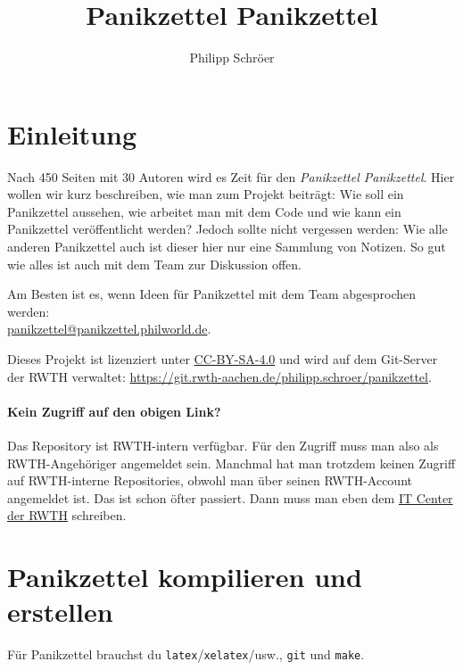 \documentclass{panikzettel}
\title{Panikzettel Panikzettel}
\author{Philipp Schröer}
\begin{document}
\maketitle

\tableofcontents

\section{Einleitung}

Nach 450 Seiten mit 30 Autoren wird es Zeit für den \emph{Panikzettel Panikzettel}.
Hier wollen wir kurz beschreiben, wie man zum Projekt beiträgt: Wie soll ein Panikzettel aussehen, wie arbeitet man mit dem Code und wie kann ein Panikzettel veröffentlicht werden?
Jedoch sollte nicht vergessen werden: Wie alle anderen Panikzettel auch ist dieser hier nur eine Sammlung von Notizen.
So gut wie alles ist auch mit dem Team zur Diskussion offen.

Am Besten ist es, wenn Ideen für Panikzettel mit dem Team abgesprochen werden: \\
\href{mailto:panikzettel@panikzettel.philworld.de}{panikzettel@panikzettel.philworld.de}.

Dieses Projekt ist lizenziert unter \href{https://creativecommons.org/licenses/by-sa/4.0/}{CC-BY-SA-4.0} und wird auf dem Git-Server der RWTH verwaltet: \url{https://git.rwth-aachen.de/philipp.schroer/panikzettel}.

\vspace{-0.5\baselineskip}
{\small{}
\paragraph{Kein Zugriff auf den obigen Link?}
Das Repository ist RWTH-intern verfügbar.
Für den Zugriff muss man also als RWTH-Angehöriger angemeldet sein.
Manchmal hat man trotzdem keinen Zugriff auf RWTH-interne Repositories, obwohl man über seinen RWTH-Account angemeldet ist.
Das ist schon öfter passiert.
Dann muss man eben dem \href{http://www.itc.rwth-aachen.de/cms/IT-Center/Services/kompletter-Servicekatalog/Beschaffungsportale/~estp/ServiceDesk/?lidx=1}{IT Center der RWTH} schreiben.}

\section{Panikzettel kompilieren und erstellen}

Für Panikzettel brauchst du \texttt{latex}/\texttt{xelatex}/usw., \texttt{git} und \texttt{make}.
\end{document}
